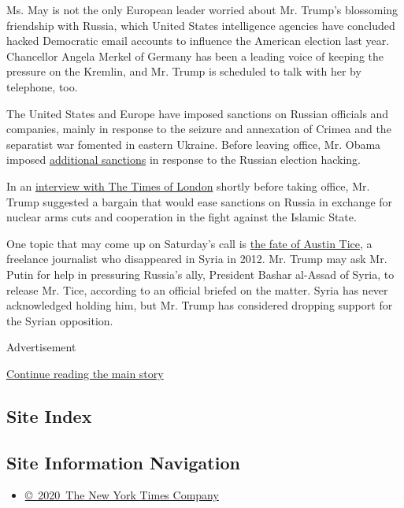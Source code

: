 Ms. May is not the only European leader worried about Mr. Trump's
blossoming friendship with Russia, which United States intelligence
agencies have concluded hacked Democratic email accounts to influence
the American election last year. Chancellor Angela Merkel of Germany has
been a leading voice of keeping the pressure on the Kremlin, and Mr.
Trump is scheduled to talk with her by telephone, too.

The United States and Europe have imposed sanctions on Russian officials
and companies, mainly in response to the seizure and annexation of
Crimea and the separatist war fomented in eastern Ukraine. Before
leaving office, Mr. Obama imposed
\href{https://www.nytimes3xbfgragh.onion/2016/12/29/us/politics/russia-election-hacking-sanctions.html}{additional
sanctions} in response to the Russian election hacking.

In an
\href{http://www.thetimes.co.uk/article/full-transcript-of-interview-with-donald-trump-5d39sr09d}{interview
with The Times of London} shortly before taking office, Mr. Trump
suggested a bargain that would ease sanctions on Russia in exchange for
nuclear arms cuts and cooperation in the fight against the Islamic
State.

One topic that may come up on Saturday's call is
\href{https://www.nytimes3xbfgragh.onion/2015/03/27/world/middleeast/us-and-syria-discuss-missing-journalist.html}{the
fate of Austin Tice}, a freelance journalist who disappeared in Syria in
2012. Mr. Trump may ask Mr. Putin for help in pressuring Russia's ally,
President Bashar al-Assad of Syria, to release Mr. Tice, according to an
official briefed on the matter. Syria has never acknowledged holding
him, but Mr. Trump has considered dropping support for the Syrian
opposition.

Advertisement

\protect\hyperlink{after-bottom}{Continue reading the main story}

\hypertarget{site-index}{%
\subsection{Site Index}\label{site-index}}

\hypertarget{site-information-navigation}{%
\subsection{Site Information
Navigation}\label{site-information-navigation}}

\begin{itemize}
\tightlist
\item
  \href{https://help.nytimes3xbfgragh.onion/hc/en-us/articles/115014792127-Copyright-notice}{©~2020~The
  New York Times Company}
\end{itemize}

